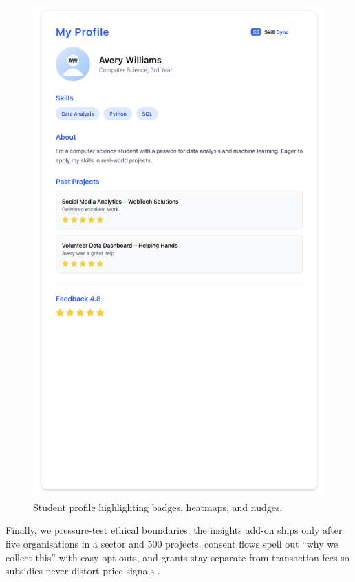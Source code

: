 \begin{figure}[H]
  \centering
  \includegraphics[width=0.8\linewidth]{figures/Student-Profile.png}
  \caption{Student profile highlighting badges, heatmaps, and nudges.}
  \label{fig:student-profile}
\end{figure}

Finally, we pressure-test ethical boundaries: the insights add-on ships only after five organisations in a sector and 500 projects, consent flows spell out ``why we collect this'' with easy opt-outs, and grants stay separate from transaction fees so subsidies never distort price signals \citep{Zuboff2019,Srnicek2017}.
